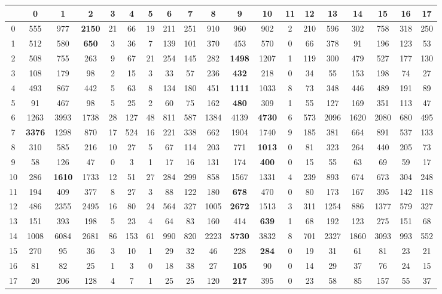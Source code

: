 \documentclass[german,version-2020-11]{uzl-thesis}
\begin{document}
\begin{enumerate}
\begin{center}
\tiny
\renewcommand{\arraystretch}{2}
\begin{tabular}[c]{ccccccccccccccccccc}
\hline
\hline 
&0&1&2&3&4&5&6&7&8&9&10&11&12&13&14&15&16&17\\
\hline
\hline
0&555& 977& \textbf{2150}& 21& 66& 19& 211& 251& 910& 960& 902& 2& 210& 596& 302& 758& 318& 250\\
\hline 
1&512& 580& \textbf{650}& 3& 36& 7& 139& 101& 370& 453& 570& 0& 66& 378& 91& 196& 123& 53\\
\hline 
2&508& 755& 263& 9& 67& 21& 254& 145& 282& \textbf{1498}& 1207& 1& 119& 300& 479& 527& 177& 130\\
\hline 
3&108& 179& 98& 2& 15& 3& 33& 57& 236& \textbf{432}& 218& 0& 34& 55& 153& 198& 74& 27\\
\hline 
4&493& 867& 442& 5& 63& 8& 134& 180& 451& \textbf{1111}& 1033& 8& 73& 348& 446& 489& 191& 89\\
\hline 
5&91& 467& 98& 5& 25& 2& 60& 75& 162& \textbf{480}& 309& 1& 55& 127& 169& 351& 113& 47\\
\hline 
6&1263& 3993& 1738& 28& 127& 48& 811& 587& 1384& 4139& \textbf{4730}& 6& 573& 2096& 1620& 2080& 680& 495\\
\hline 
7&\textbf{3376}& 1298& 870& 17& 524& 16& 221& 338& 662& 1904& 1740& 9& 185& 381& 664& 891& 537& 133\\
\hline 
8&310& 585& 216& 10& 27& 5& 67& 114& 203& 771 & \textbf{1013}& 0& 81& 323& 264& 440& 205& 73\\
\hline 
9&58& 126& 47& 0& 3& 1& 17& 16& 131& 174& \textbf{400}& 0& 15& 55& 63& 69& 59& 17\\
\hline 
10&286& \textbf{1610}& 1733& 12& 51& 27& 284& 299& 858& 1567& 1331& 4& 239& 893& 674& 673& 304& 248\\
\hline 
11&194& 409& 377& 8& 27& 3& 88& 122& 180& \textbf{678}& 470& 0& 80& 173& 167& 395& 142& 118\\
\hline 
12&486& 2355& 2495& 16& 80& 24& 564& 327& 1005& \textbf{2672}& 1513& 3& 311& 1254& 886& 1377& 579& 327\\
\hline 
13&151& 393& 198& 5& 23& 4& 64& 83& 160& 414& \textbf{639}& 1& 68& 192& 123& 275& 151& 68\\
\hline 
14&1008& 6084& 2681& 86& 153& 61& 990& 820& 2223& \textbf{5730}& 3832& 8& 701& 2327& 1860& 3093& 993& 552\\
\hline 
15&270& 95& 36& 3& 10& 1& 29& 32& 46& 228& \textbf{284}& 0& 19& 31& 61& 81& 23& 21\\
\hline 
16&81& 82& 25& 1& 3& 0& 18& 38& 27& \textbf{105}& 90& 0& 14& 29& 37& 76& 24& 15\\
\hline
17&20& 206& 128& 4& 7& 1& 25& 25& 120& \textbf{217}& 395& 0& 23& 58& 85& 157& 55& 37\\
\hline
\hline
\end{tabular}
\end{center}\\


\end{enumerate}
\end{document}
